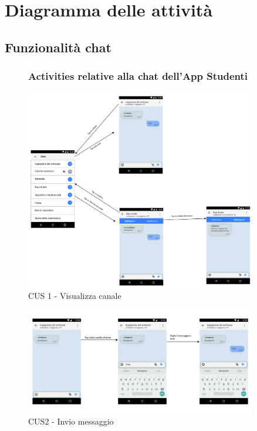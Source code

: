 \section{Diagramma delle attività}

\subsection{Funzionalità chat}

\begin{figure}[!h]
	\subsubsection{Activities relative alla chat dell'App Studenti}
	\centering
	\includegraphics[width=0.9\textwidth]{imgs/gruppo6/activities/act_cus1_visualizza_canale.pdf}
	\caption{CUS 1 - Visualizza canale}
	\label{fig:act-cus1}
\end{figure}

\begin{figure}
	\centering
	\includegraphics[width=0.9\textwidth]{imgs/gruppo6/activities/act_cus2_invio_messaggio.pdf}
	\caption{CUS2 - Invio messaggio}
	\label{fig:act-cus2}
\end{figure}

